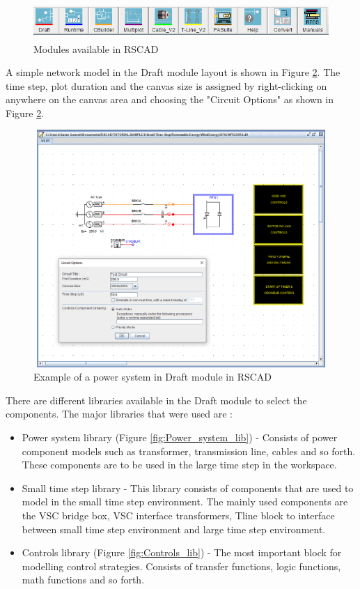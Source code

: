 \begin{figure}[H]
\centering
    \includegraphics[height = 1.4cm,width = 14.5cm]{Diagrams/Chapter_3/RSCAD_modules.PNG}
    \caption{Modules available in RSCAD}
    \label{fig:RSCAD_modules}
\end{figure}

A simple network model in the Draft module layout is shown in Figure \ref{fig:Dft_RSCAD}. The time step, plot duration and the canvas size is assigned by right-clicking on anywhere on the canvas area and choosing the "Circuit Options" as shown in Figure \ref{fig:Dft_RSCAD}.

\begin{figure}[H]
\centering
    \includegraphics[height = 9cm,width = 11.5cm]{Diagrams/Chapter_3/Dft_RSCAD.PNG}
    \caption{Example of a power system in Draft module in RSCAD}
    \label{fig:Dft_RSCAD}
\end{figure}

There are different libraries available in the Draft module to select the components. The major libraries that were used are \cite{rtds_tech}:
\begin{itemize}\label{Library_RSCAD}
    \item Power system library (Figure \ref{fig:Power_system_lib}) - Consists of power component models such as transformer, transmission line, cables and so forth. These components are to be used in the large time step in the workspace. 
    \item Small time step library - This library consists of components that are used to model in the small time step environment. The mainly used components are the \gls{VSC} bridge box, \gls{VSC} interface transformers, Tline block to interface between small time step environment and large time step environment.    
    \item Controls library (Figure \ref{fig:Controls_lib}) - The most important block for modelling control strategies. Consists of transfer functions, logic functions, math functions and so forth.
\end{itemize}

